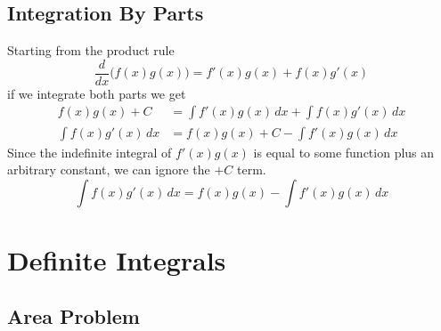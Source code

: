 \documentclass{article}
\begin{document}
\subsection{Integration By Parts}

Starting from the product rule
\[
    \frac{d}{dx}\big(f(x)g(x)\big)=f'(x)g(x)+f(x)g'(x)
\]
if we integrate both parts we get
\begin{align*}
    f(x)g(x)+C&=\int f'(x)g(x)\,dx+\int f(x)g'(x)\,dx \\
    \int f(x)g'(x)\,dx &= f(x)g(x)+C - \int f'(x)g(x)\,dx 
\end{align*}
Since the indefinite integral of \(f'(x)g(x)\) is equal to some function plus an arbitrary constant, we can ignore the \(+C\) term.
\[
    \int f(x)g'(x)\,dx = f(x)g(x) - \int f'(x)g(x)\,dx
\]

\pagebreak

\section{Definite Integrals}

\subsection{Area Problem}
\end{document}
